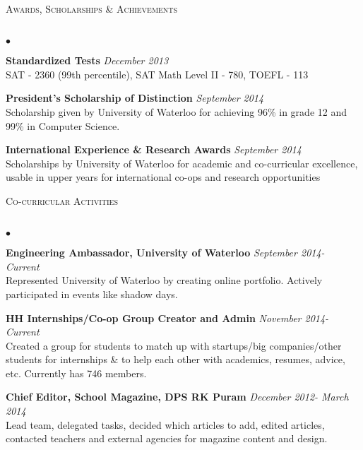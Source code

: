 \documentclass[10pt]{article}
\newcommand{\lineunder}{\vspace*{-8pt} \\ \hspace*{-18pt} \hrulefill \\}
\newcommand{\header}[1]{{\hspace*{-15pt}\vspace*{6pt} \textsc{#1}} \vspace*{-6pt} \lineunder}
\newenvironment{achievements}{\begin{list}{$\bullet$}{\topsep 0pt \itemsep -1.5pt \leftmargin 5pt}}{\vspace*{4pt}\end{list}}
\begin{document}
\vspace{6pt}

\header{\normalsize Awards, Scholarships \& Achievements}
\begin{achievements}
\item \textbf{Standardized Tests} \hfill \textit {December 2013}
\\ SAT - 2360 (99th percentile), SAT Math Level II - 780, TOEFL - 113 
\item \textbf{President's Scholarship of Distinction} \hfill \textit {September 2014}
\\ Scholarship given by University of Waterloo for achieving 96\% in grade 12 and 99\% in Computer Science.
\item \textbf{International Experience \& Research Awards} \hfill \textit {September 2014}
\\ Scholarships by University of Waterloo for academic and co-curricular excellence, usable in upper years for international co-ops and research opportunities
\end{achievements}

\vspace{6pt}

\header{\normalsize Co-curricular Activities}
\begin{achievements}
\item \textbf{Engineering Ambassador, University of Waterloo} \hfill \textit {September 2014- Current}
\\ Represented University of Waterloo by creating online portfolio. Actively participated in events like shadow days.
\item \textbf{HH Internships/Co-op Group Creator and Admin} \hfill \textit {November 2014- Current}
\\ Created a group for students to match up with startups/big companies/other students for internships \& to help each other with academics, resumes, advice, etc. Currently has 746 members.
\item \textbf{Chief Editor, School Magazine, DPS RK Puram} \hfill \textit {December 2012- March 2014}
\\ Lead team, delegated tasks, decided which articles to add, edited articles, contacted teachers and external agencies for magazine content and design.
\end{achievements}
\end{document}
